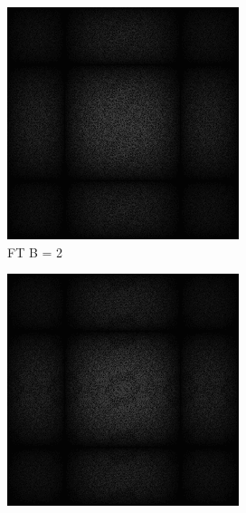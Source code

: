 \begin{figure}[H]
    \centering
    \begin{subfigure}[b]{0.2\linewidth}
      \includegraphics[width=\linewidth]{content/TemporalerAlg/Bilder/Sorting/DiffDimensions/2/seed_debug_5.0_small.png}
       \caption{FT B = 2}
       \label{pic:fftB_2}
    \end{subfigure}
    \begin{subfigure}[b]{0.2\linewidth}
      \includegraphics[width=\linewidth]{content/TemporalerAlg/Bilder/Sorting/DiffDimensions/3/seed_debug_5.0_small.png}

\end{subfigure}
\end{figure}
